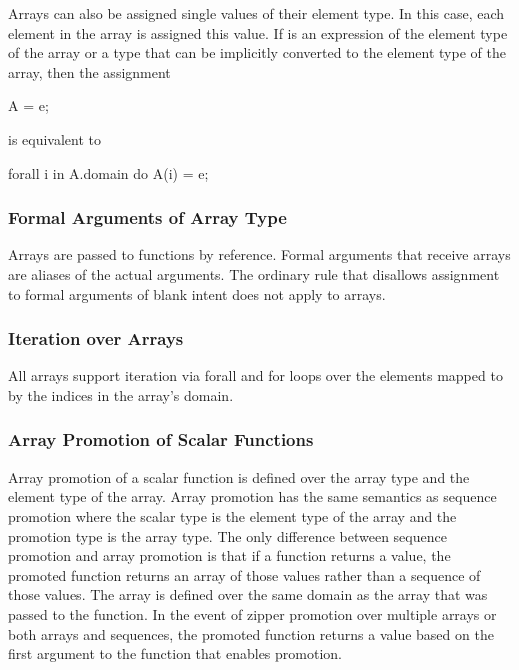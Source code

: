 Arrays can also be assigned single values of their element type.  In
this case, each element in the array is assigned this value.
If  is an expression of the element type of the array or a
type that can be implicitly converted to the element type of the
array, then the assignment
\begin{chapel}
A = e;
\end{chapel}
is equivalent to
\begin{chapel}
forall i in A.domain do
  A(i) = e;
\end{chapel}

\subsubsection{Formal Arguments of Array Type}
\label{Formal_Arguments_of_Array_Type}

Arrays are passed to functions by reference.  Formal arguments that
receive arrays are aliases of the actual arguments.  The ordinary rule
that disallows assignment to formal arguments of blank intent does not
apply to arrays.

\subsubsection{Iteration over Arrays}
\label{Iteration_over_Arrays}

All arrays support iteration via forall and for loops over the
elements mapped to by the indices in the array's domain.

\subsubsection{Array Promotion of Scalar Functions}
\label{Array_Promotion_of_Scalar_Functions}

Array promotion of a scalar function is defined over the array type
and the element type of the array.  Array promotion has the same
semantics as sequence promotion where the scalar type is the element
type of the array and the promotion type is the array type.  The only
difference between sequence promotion and array promotion is that if a
function returns a value, the promoted function returns an array of
those values rather than a sequence of those values.  The array is
defined over the same domain as the array that was passed to the
function.  In the event of zipper promotion over multiple arrays or
both arrays and sequences, the promoted function returns a value based
on the first argument to the function that enables promotion.

